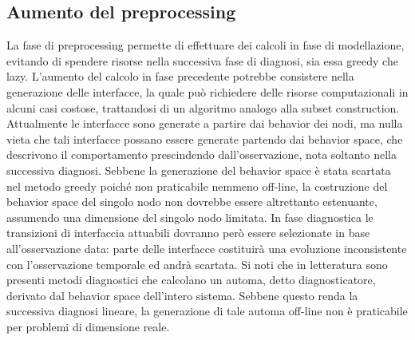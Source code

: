 \subsection{Aumento del preprocessing}
La fase di preprocessing permette di effettuare dei calcoli in fase di modellazione, evitando di spendere risorse nella successiva fase di diagnosi, sia essa greedy che lazy. L'aumento del calcolo in fase precedente potrebbe consistere nella generazione delle interfacce, la quale può richiedere delle risorse computazionali in alcuni casi costose, trattandosi di un algoritmo analogo alla subset construction. Attualmente le interfacce sono generate a partire dai behavior dei nodi, ma nulla vieta che tali interfacce possano essere generate partendo dai behavior space, che descrivono il comportamento prescindendo dall'osservazione, nota soltanto nella successiva diagnosi. Sebbene la generazione del behavior space è stata scartata nel metodo greedy poiché non praticabile nemmeno off-line, la costruzione del behavior space del singolo nodo non dovrebbe essere altrettanto estenuante, assumendo una dimensione del singolo nodo limitata. In fase diagnostica le transizioni di interfaccia attuabili dovranno però essere selezionate in base all'osservazione data: parte delle interfacce costituirà una evoluzione inconsistente con l'osservazione temporale ed andrà scartata. Si noti che in letteratura sono presenti metodi diagnostici che calcolano un automa, detto diagnosticatore, derivato dal behavior space dell'intero sistema. Sebbene questo renda la successiva diagnosi lineare, la generazione di tale automa off-line non è praticabile per problemi di dimensione reale.



